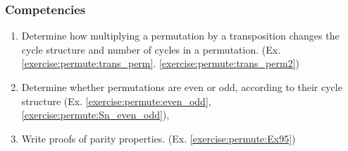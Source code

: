 \subsubsection*{Competencies}
\begin{enumerate}
\item
 Determine how multiplying a permutation by a transposition changes the cycle structure and number of cycles in a  permutation.  (Ex. \ref{exercise:permute:trans_perm}. \ref{exercise:permute:trans_perm2})
\item
Determine whether permutations are even or odd, according to their cycle structure (Ex. \ref{exercise:permute:even_odd},  \ref{exercise:permute:Sn_even_odd}),
\item
Write proofs of parity properties. (Ex. \ref{exercise:permute:Ex95})
\end{enumerate}
%
%
%
%
%
%
%
%





